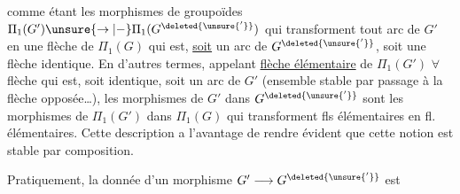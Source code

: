 comme étant les morphismes de groupoïdes $\Pi_1(G')\unsure{\to|{-}}\Pi_1(G^{\deleted{\unsure{'}}})$ qui transforment tout arc de $G'$ en une flèche de $\Pi_1(G)$ qui est, \uline{soit} un arc de $G^{\deleted{\unsure{'}}}$, soit une flèche identique. En d'autres termes, appelant \uline{flèche élémentaire} de $\Pi_1(G')$ $\forall$ flèche qui est, soit identique, soit un arc de $G'$ (ensemble  stable par passage à la flèche opposée\ldots), les morphismes   de $G'$ dans $G^{\deleted{\unsure{'}}}$ sont les morphismes de $\Pi_1(G')$ dans $\Pi_1(G)$ qui transforment fls élémentaires en fl. élémentaires. Cette description a l'avantage de rendre évident que cette notion est stable par composition.

Pratiquement, la donnée d'un morphisme    $G'\longrightarrow G^{\deleted{\unsure{'}}}$ est 
